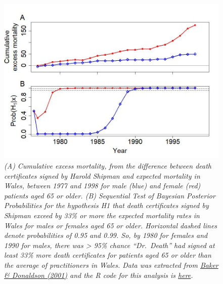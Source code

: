 \documentclass[
]{article}
\begin{document}
\begin{figure}
\centering
\includegraphics{Figures/Fig3Post.jpeg}
\caption{\emph{(A) Cumulative excess mortality, from the difference
between death certificates signed by Harold Shipman and expected
mortality in Wales, between 1977 and 1998 for male (blue) and female
(red) patients aged 65 or older. (B) Sequential Test of Bayesian
Posterior Probabilities for the hypothesis H1 that death certificates
signed by Shipman exceed by 33\% or more the expected mortality rates in
Wales for males or females aged 65 or older. Horizontal dashed lines
denote probabilities of 0.95 and 0.99. So, by 1980 for females and 1990
for males, there was \textgreater{} 95\% chance ``Dr.~Death'' had signed
at least 33\% more death certificates for patients aged 65 or older than
the average of practitioners in Wales. Data was extracted from
\href{https://www.researchgate.net/publication/320035425_Harold_Shipmans_clinical_practice_1974-1998_A_clinical_audit_commissioned_by_the_Chief_Medical_Officer}{Baker
\& Donaldson (2001)} and the R code for this analysis is
\href{https://github.com/rincondf/STBP/blob/403d7b559543d0f1f33097755c0dc253affbe5ea/ShipmanAnalysis.R}{here}.}}
\end{figure}
\end{document}
